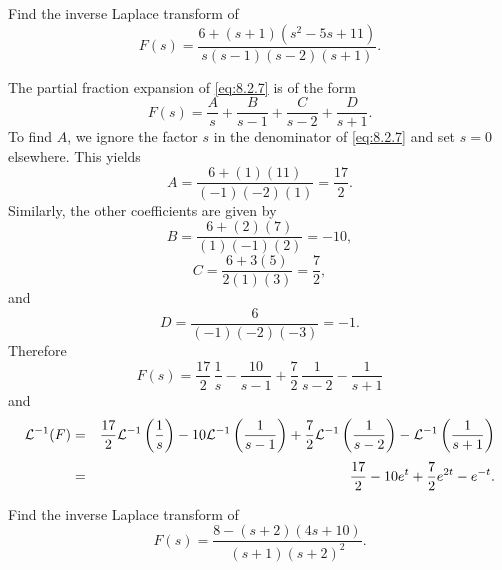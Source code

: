 \begin{example}
  \label{example:8.2.5}\rm Find the inverse Laplace transform of
  \begin{equation}
    \label{eq:8.2.7}F(s)=\frac{6+(s+1)(s^{2}-5s+11)}{s(s-1)(s-2)(s+1)}.
  \end{equation}
\end{example}

\begin{examplesolution}
\solution The partial fraction expansion of \eqref{eq:8.2.7} is of the form
\begin{equation}
  \label{eq:8.2.8}F(s)=\frac{A}{s}+\frac{B}{s-1}+\frac{C}{s-2}+\frac{D}{s+1}.
\end{equation}
To find $A$, we ignore the factor $s$ in the denominator of \eqref{eq:8.2.7} and set $s=0$
elsewhere. This yields
\[
  A=\frac{6+(1)(11)}{(-1)(-2)(1)}=\frac{17}{2}.
\]
Similarly, the other coefficients are given by
\[
  B=\frac{6+(2)(7)}{(1)(-1)(2)}=-10,
\]
\[
  C=\frac{6+3(5)}{2(1)(3)}=\frac{7}{2},
\]
and
\[
  D=\frac{6}{(-1)(-2)(-3)}=-1.
\]
Therefore
\[
  F(s)=\frac{17}{2}\,\frac{1}{s}-\frac{10}{s-1}+\frac{7}{2}\,\frac{1}{s-2}-\frac{1}{s+1}
\]
and
\begin{eqnarray*}
  {\cal L}^{-1}(F) & = & \frac{17}{2}{\cal L}^{-1}\left(\frac{1}{s}\right)-10{\cal L}^{-1}\left(\frac{1}{s-1}\right)+\frac{7}{2}{\cal L}^{-1}\left(\frac{1}{s-2}\right)-{\cal L}^{-1}\left(\frac{1}{s+1}\right) \\[1\jot]
                   & = & \frac{17}{2}-10e^{t}+\frac{7}{2}e^{2t}-e^{-t}.
\end{eqnarray*}

\color{blue}
\color{black}
\end{examplesolution}

\begin{example}
  \label{example:8.2.6}\rm Find the inverse Laplace transform of
  \begin{equation}
    \label{eq:8.2.9}F(s)=\frac{8-(s+2)(4s+10)}{(s+1)(s+2)^{2}}.
  \end{equation}
\end{example}

